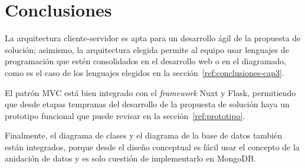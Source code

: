 \newpage\section{Conclusiones}

La arquitectura cliente-servidor es apta para un desarrollo ágil de la propuesta de solución; asimismo, la arquitectura elegida permite al equipo usar lenguajes de programación que estén consolidados en el desarrollo web o en el diagramado, como es el caso de los lenguajes elegidos en la sección~\ref{ref:conclusiones-cap3}.


El patrón MVC está bien integrado con el \textit{framework} Nuxt y Flask, permitiendo que desde etapas tempranas del desarrollo de la propuesta de solución haya un prototipo funcional que puede revisar en la sección~\ref{ref:prototipo}.


Finalmente, el diagrama de clases y el diagrama de la base de datos también están integrados, porque desde el diseño conceptual es fácil usar el concepto de la anidación de datos y es solo cuestión de implementarlo en MongoDB.